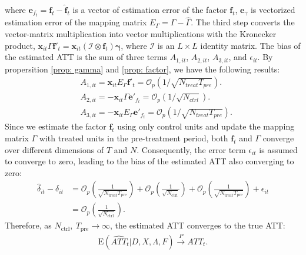 \documentclass[12pt]{article}
\begin{document}
\noindent where $\mathbf{e}_{f_t} = \mathbf{f}_t - \hat{\mathbf{f}}_t$ is a vector of estimation error of the factor $\mathbf{f}_t$, $\mathbf{e}_{\gamma}$ is vectorized estimation error of the mapping matrix $E_{\Gamma} = \Gamma - \hat{\Gamma}$. The third step converts the vector-matrix multiplication into vector multiplications with the Kronecker product, $\mathbf{x}_{it}\Gamma\mathbf{f}'_t = \mathbf{x}_{it}(\mathcal{I} \otimes \mathbf{f}_t)\bm{\gamma}$, where $\mathcal{I}$ is an $L \times L$ identity matrix. The bias of the estimated ATT is the sum of three terms $A_{1,it}$, $A_{2,it}$, $A_{3,it}$, and $\epsilon_{it}$. By propersition \ref{prop: gamma} and \ref{prop: factor}, we have the following results:
\begin{equation*}
\begin{aligned}
    &A_{1,it} = \mathbf{x}_{it}E_{\Gamma}\mathbf{f}'_t = \mathcal{O}_p\left(1/\sqrt{N_{treat}T_{pre}}\right). \\
    &A_{2,it} = -\mathbf{x}_{it}\Gamma \mathbf{e}'_{f_t} = \mathcal{O}_p\left(1/\sqrt{N_{ctrl}}\right). \\
    &A_{3,it} = -\mathbf{x}_{it}E_{\Gamma}\mathbf{e}'_{f_t} = \mathcal{O}_p\left(1/\sqrt{N_{treat}T_{pre}}\right).
\end{aligned}
\end{equation*}
Since we estimate the factor $\mathbf{f}_t$ using only control units and update the mapping matrix $\Gamma$ with treated units in the pre-treatment period, both $\mathbf{f}_t$ and $\Gamma$ converge over different dimensions of $T$ and $N$. Consequently, the error term $\epsilon_{it}$ is assumed to converge to zero, leading to the bias of the estimated ATT also converging to zero:
\begin{equation*}
\begin{aligned}
    \hat{\delta}_{it} - \delta_{it} &= \mathcal{O}_p\left(\frac{1}{\sqrt{N_{\text{treat}}T_{\text{pre}}}}\right) + \mathcal{O}_p\left(\frac{1}{\sqrt{N_{\text{ctrl}}}}\right) + \mathcal{O}_p\left(\frac{1}{\sqrt{N_{\text{treat}}T_{\text{pre}}}}\right) + \epsilon_{it} \\
    &= \mathcal{O}_p\left(\frac{1}{\sqrt{N_{\text{ctrl}}}}\right).
\end{aligned}
\end{equation*}
Therefore, as $N_{\text{ctrl}}, \ T_{\text{pre}} \to \infty$, the estimated ATT converges to the true ATT:
\begin{equation*}
\begin{aligned}
    \mathrm{E}\left(\widehat{ATT}_{t} | D, X, \Lambda, F\right) \xrightarrow{P} ATT_{t}.
\end{aligned}
\end{equation*}
\end{document}
